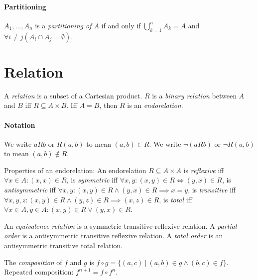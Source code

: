 \paragraph{Partitioning}
\(A_1,\ldots,A_n\) is a \emph{partitioning of \(A\)} if and only if
\(\bigcup_{k=1}^n A_k = A\) and
\(\forall i \neq j (A_i \cap A_j = \emptyset)\).

\section{Relation}

%
A \emph{relation} is a subset of a Cartesian product.
%
%
\(R\) is a \emph{binary relation} between \(A\) and \(B\) iff \(R \subseteq A \times B\).
Iff \(A = B\), then \(R\) is an \emph{endorelation}.

\paragraph{Notation}
We write \(a R b\) or \(R(a,b)\) to mean \((a,b) \in R\).
We write \(\neg (a R b)\) or \(\neg R(a,b)\) to mean \((a,b) \not\in R\).

Properties of an endorelation:
%
%
An endorelation \(R \subseteq A \times A\) is \emph{reflexive} iff
\(\forall x \in A : (x,x) \in R\),
%
%
is \emph{symmetric} iff
\(\forall x,y: (x,y) \in R \iff (y,x) \in R\),
%
%
is \emph{antisymmetric} iff
\(\forall x,y: (x,y) \in R \wedge (y,x) \in R \implies x = y\),
%
%
is \emph{transitive} iff
\(\forall x,y,z: (x,y) \in R \wedge (y,z) \in R \implies (x,z) \in R\),
%
%
is \emph{total} iff
\(\forall x \in A , y \in A : (x,y) \in R \vee (y,x) \in R\).

%
%
An \emph{equivalence relation} is a symmetric transitive reflexive relation.
%
%
%
%
A \emph{partial order} is a antisymmetric transitive reflexive relation.
A \emph{total order} is an antisymmetric transitive total relation.

The
%
%
%
\emph{composition} of \(f\) and \(g\) is
\(f \circ g = \{ (a,c) ~|~ (a,b) \in g \wedge (b,c) \in f \}\).
Repeated composition: \(f^{n+1} = f \circ f^n\).


